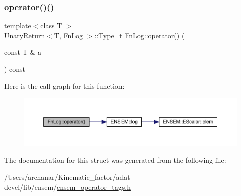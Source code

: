 \subsubsection{\texorpdfstring{operator()()}{operator()()}\hspace{0.1cm}{\footnotesize\ttfamily [3/3]}}
{\footnotesize\ttfamily template$<$class T $>$ \\
\mbox{\hyperlink{structUnaryReturn}{Unary\+Return}}$<$T, \mbox{\hyperlink{structFnLog}{Fn\+Log}} $>$\+::Type\+\_\+t Fn\+Log\+::operator() (\begin{DoxyParamCaption}\item[{const T \&}]{a }\end{DoxyParamCaption}) const\hspace{0.3cm}{\ttfamily [inline]}}

Here is the call graph for this function\+:
\nopagebreak
\begin{figure}[H]
\begin{center}
\leavevmode
\includegraphics[width=350pt]{d6/d29/structFnLog_a888c66c42f3d71caf35dd0d0cf80d6fb_cgraph}
\end{center}
\end{figure}


The documentation for this struct was generated from the following file\+:\begin{DoxyCompactItemize}
\item 
/\+Users/archanar/\+Kinematic\+\_\+factor/adat-\/devel/lib/ensem/\mbox{\hyperlink{adat-devel_2lib_2ensem_2ensem__operator__tags_8h}{ensem\+\_\+operator\+\_\+tags.\+h}}\end{DoxyCompactItemize}
